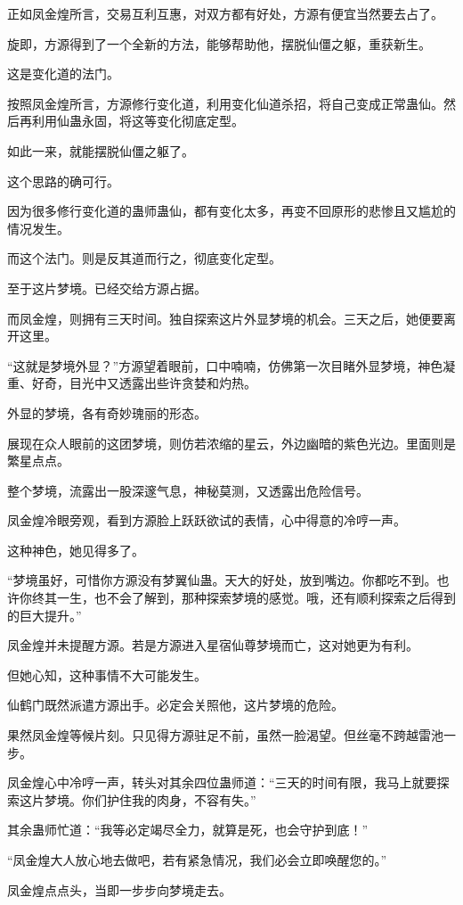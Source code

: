\begin{this_body}
正如凤金煌所言，交易互利互惠，对双方都有好处，方源有便宜当然要去占了。

旋即，方源得到了一个全新的方法，能够帮助他，摆脱仙僵之躯，重获新生。

这是变化道的法门。

按照凤金煌所言，方源修行变化道，利用变化仙道杀招，将自己变成正常蛊仙。然后再利用仙蛊永固，将这等变化彻底定型。

如此一来，就能摆脱仙僵之躯了。

这个思路的确可行。

因为很多修行变化道的蛊师蛊仙，都有变化太多，再变不回原形的悲惨且又尴尬的情况发生。

而这个法门。则是反其道而行之，彻底变化定型。

至于这片梦境。已经交给方源占据。

而凤金煌，则拥有三天时间。独自探索这片外显梦境的机会。三天之后，她便要离开这里。

“这就是梦境外显？”方源望着眼前，口中喃喃，仿佛第一次目睹外显梦境，神色凝重、好奇，目光中又透露出些许贪婪和灼热。

外显的梦境，各有奇妙瑰丽的形态。

展现在众人眼前的这团梦境，则仿若浓缩的星云，外边幽暗的紫色光边。里面则是繁星点点。

整个梦境，流露出一股深邃气息，神秘莫测，又透露出危险信号。

凤金煌冷眼旁观，看到方源脸上跃跃欲试的表情，心中得意的冷哼一声。

这种神色，她见得多了。

“梦境虽好，可惜你方源没有梦翼仙蛊。天大的好处，放到嘴边。你都吃不到。也许你终其一生，也不会了解到，那种探索梦境的感觉。哦，还有顺利探索之后得到的巨大提升。”

凤金煌并未提醒方源。若是方源进入星宿仙尊梦境而亡，这对她更为有利。

但她心知，这种事情不大可能发生。

仙鹤门既然派遣方源出手。必定会关照他，这片梦境的危险。

果然凤金煌等候片刻。只见得方源驻足不前，虽然一脸渴望。但丝毫不跨越雷池一步。

凤金煌心中冷哼一声，转头对其余四位蛊师道：“三天的时间有限，我马上就要探索这片梦境。你们护住我的肉身，不容有失。”

其余蛊师忙道：“我等必定竭尽全力，就算是死，也会守护到底！”

“凤金煌大人放心地去做吧，若有紧急情况，我们必会立即唤醒您的。”

凤金煌点点头，当即一步步向梦境走去。


\end{this_body}
